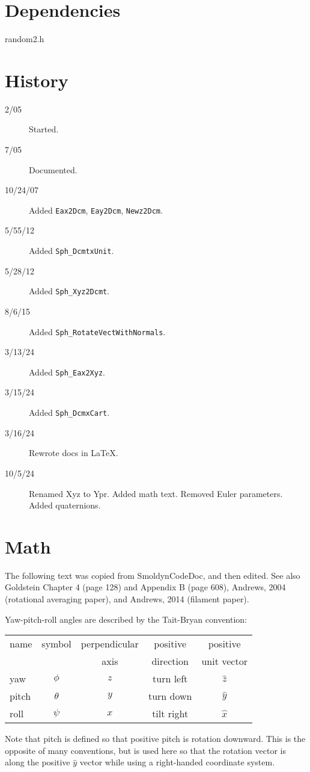 \documentclass[11pt]{article}
\newcommand {\ttt} {\texttt}
\begin{document}
\section{Dependencies}
random2.h

\section{History}
\begin{description}

\item[2/05] Started.
\item[7/05] Documented.
\item[10/24/07] Added \ttt{Eax2Dcm}, \ttt{Eay2Dcm}, \ttt{Newz2Dcm}.
\item[5/55/12] Added \ttt{Sph\_DcmtxUnit}.
\item[5/28/12] Added \ttt{Sph\_Xyz2Dcmt}.
\item[8/6/15] Added \ttt{Sph\_RotateVectWithNormals}.
\item[3/13/24] Added \ttt{Sph\_Eax2Xyz}.
\item[3/15/24] Added \ttt{Sph\_DcmxCart}.
\item[3/16/24] Rewrote docs in LaTeX.
\item[10/5/24] Renamed Xyz to Ypr. Added math text. Removed Euler parameters. Added quaternions.

\end{description}


\section{Math}

The following text was copied from SmoldynCodeDoc, and then edited. See also Goldstein Chapter 4 (page 128) and Appendix B (page 608), Andrews, 2004 (rotational averaging paper), and Andrews, 2014 (filament paper).

Yaw-pitch-roll angles are described by the Tait-Bryan convention:
\begin{longtable}[c]{lcccc}
name & symbol & perpendicular & positive & positive \\
 &  & axis & direction & unit vector \\
\hline
yaw & $\phi$ & $z$ & turn left & $\hat{z}$ \\
pitch & $\theta$ & $y$ & turn down & $\hat{y}$ \\
roll & $\psi$ & $x$ & tilt right & $\hat{x}$
\end{longtable}
Note that pitch is defined so that positive pitch is rotation downward. This is the opposite of many conventions, but is used here so that the rotation vector is along the positive $\hat{y}$ vector while using a right-handed coordinate system.
\end{document}
